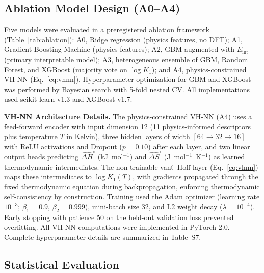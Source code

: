\documentclass[journal=jacsat,manuscript=article]{achemso}
\begin{document}
\subsection{Ablation Model Design (A0--A4)}

Five models were evaluated in a preregistered ablation framework
(Table~\ref{tab:ablation}):
A0, Ridge regression\cite{Pedregosa2011} (physics features, no DFT);
A1, Gradient Boosting Machine\cite{Friedman2001} (physics features);
A2, GBM augmented with $E_\mathrm{int}$ (primary interpretable model);
A3, heterogeneous ensemble of GBM,\cite{Friedman2001}
Random Forest,\cite{Breiman2001} and
XGBoost\cite{Chen2016} (majority vote on $\log K_1$); and
A4, physics-constrained VH-NN (Eq.~\ref{eq:vhnn}).
Hyperparameter optimization for GBM and XGBoost was performed by Bayesian search
with 5-fold nested CV.\cite{Pedregosa2011}
All implementations used scikit-learn v1.3\cite{Pedregosa2011} and XGBoost v1.7.\cite{Chen2016}

\textbf{VH-NN Architecture Details.}
The physics-constrained VH-NN (A4) uses a feed-forward encoder
with input dimension 12 (11 physics-informed descriptors plus temperature $T$ in Kelvin),
three hidden layers of width $[64 \to 32 \to 16]$ with ReLU activations and Dropout
($p = 0.10$) after each layer, and two linear output heads predicting
$\widehat{\Delta H}^\circ$ (kJ~mol$^{-1}$) and $\widehat{\Delta S}^\circ$
(J~mol$^{-1}$~K$^{-1}$) as learned thermodynamic intermediates.
The non-trainable van\'t~Hoff layer (Eq.~\ref{eq:vhnn}) maps these intermediates
to $\log K_1(T)$, with gradients propagated through the fixed thermodynamic equation
during backpropagation, enforcing thermodynamic self-consistency by construction.
Training used the Adam optimizer\cite{Kingma2015} (learning rate $10^{-3}$;
$\beta_1 = 0.9$, $\beta_2 = 0.999$), mini-batch size 32, and L2 weight decay
($\lambda = 10^{-4}$).
Early stopping with patience 50 on the held-out validation loss prevented overfitting.
All VH-NN computations were implemented in PyTorch 2.0.\cite{Paszke2019}
Complete hyperparameter details are summarized in Table~S7.

\subsection{Statistical Evaluation}
\end{document}
